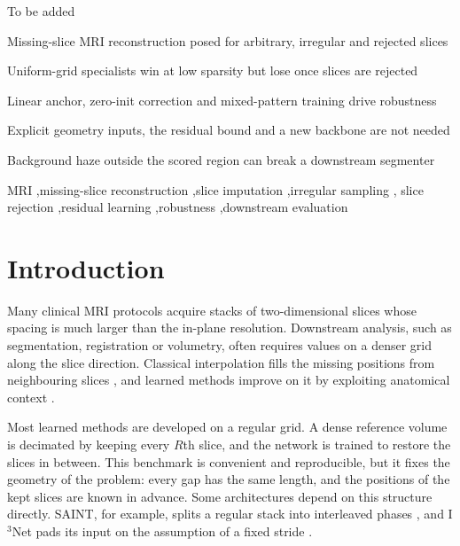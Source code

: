 \documentclass[a4paper,fleqn]{cas-dc}
\newcommand{\Ithree}{I$^3$Net\xspace}
\begin{document}
\begin{graphicalabstract}
To be added
\end{graphicalabstract}

\begin{highlights}
\item Missing-slice MRI reconstruction posed for arbitrary, irregular and rejected slices
\item Uniform-grid specialists win at low sparsity but lose once slices are rejected
\item Linear anchor, zero-init correction and mixed-pattern training drive robustness
\item Explicit geometry inputs, the residual bound and a new backbone are not needed
\item Background haze outside the scored region can break a downstream segmenter
\end{highlights}

\begin{keywords}
MRI \sep missing-slice reconstruction \sep slice imputation \sep irregular sampling \sep
slice rejection \sep residual learning \sep robustness \sep downstream evaluation
\end{keywords}

\maketitle

\section{Introduction}
\label{sec:intro}

Many clinical MRI protocols acquire stacks of two-dimensional slices whose spacing is much
larger than the in-plane resolution. Downstream analysis, such as segmentation, registration
or volumetry, often requires values on a denser grid along the slice direction. Classical
interpolation fills the missing positions from neighbouring slices
\citep{lehmann1999interp}, and learned methods improve on it by exploiting anatomical
context \citep{chaudhari2018deepresolve,chen2018dcsrn,peng2020saint,song2024i3net}.

Most learned methods are developed on a regular grid. A dense reference volume is decimated
by keeping every $R$th slice, and the network is trained to restore the slices in between.
This benchmark is convenient and reproducible, but it fixes the geometry of the problem:
every gap has the same length, and the positions of the kept slices are known in advance.
Some architectures depend on this structure directly. SAINT, for example, splits a regular
stack into interleaved phases \citep{peng2020saint}, and \Ithree pads its input on the
assumption of a fixed stride \citep{song2024i3net}.
\end{document}
